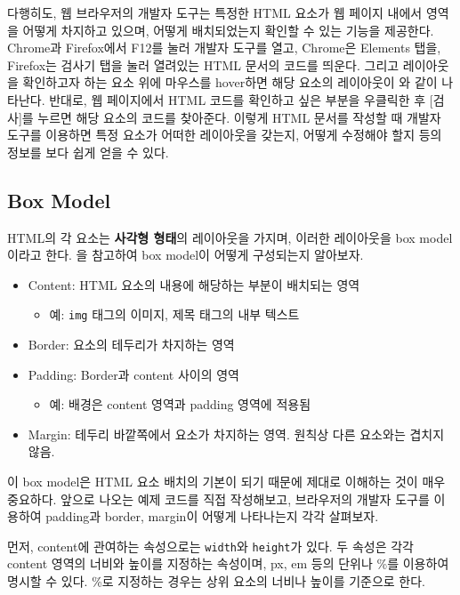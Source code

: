 다행히도, 웹 브라우저의 개발자 도구는 특정한 HTML 요소가 웹 페이지 내에서 영역을 어떻게 차지하고 있으며, 어떻게 배치되었는지 확인할 수 있는 기능을 제공한다. Chrome과 Firefox에서 F12를 눌러 개발자 도구를 열고, Chrome은 Elements 탭을, Firefox는 검사기 탭을 눌러 열려있는 HTML 문서의 코드를 띄운다. 그리고 레이아웃을 확인하고자 하는 요소 위에 마우스를 hover하면 해당 요소의 레이아웃이 와 같이 나타난다. 반대로, 웹 페이지에서 HTML 코드를 확인하고 싶은 부분을 우클릭한 후 [검사]를 누르면 해당 요소의 코드를 찾아준다. 이렇게 HTML 문서를 작성할 때 개발자 도구를 이용하면 특정 요소가 어떠한 레이아웃을 갖는지, 어떻게 수정해야 할지 등의 정보를 보다 쉽게 얻을 수 있다.

\subsection*{Box Model}
HTML의 각 요소는 \textbf{사각형 형태}의 레이아웃을 가지며, 이러한 레이아웃을 box model이라고 한다. 을 참고하여 box model이 어떻게 구성되는지 알아보자.

\begin{itemize}
    \item Content: HTML 요소의 내용에 해당하는 부분이 배치되는 영역
    \begin{itemize}
        \item 예: \texttt{img} 태그의 이미지, 제목 태그의 내부 텍스트
    \end{itemize}
    \item Border: 요소의 테두리가 차지하는 영역
    \item Padding: Border과 content 사이의 영역
    \begin{itemize}
        \item 예: 배경은 content 영역과 padding 영역에 적용됨
    \end{itemize}
    \item Margin: 테두리 바깥쪽에서 요소가 차지하는 영역. 원칙상 다른 요소와는 겹치지 않음.
\end{itemize}


이 box model은 HTML 요소 배치의 기본이 되기 때문에 제대로 이해하는 것이 매우 중요하다. 앞으로 나오는 예제 코드를 직접 작성해보고, 브라우저의 개발자 도구를 이용하여 padding과 border, margin이 어떻게 나타나는지 각각 살펴보자.

먼저, content에 관여하는 속성으로는 \texttt{width}와 \texttt{height}가 있다. 두 속성은 각각 content 영역의 너비와 높이를 지정하는 속성이며, px, em 등의 단위나 \%를 이용하여 명시할 수 있다. \%로 지정하는 경우는 상위 요소의 너비나 높이를 기준으로 한다.

